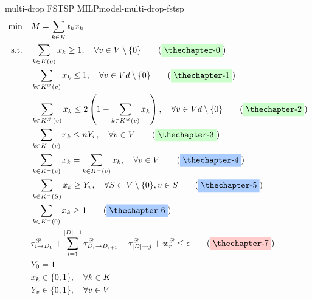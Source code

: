 {
\newcommand{\myYellowTag}[1]{\label{#1}\tag{\colorbox{shallow-yellow}{\theequation}}\addtocounter{equation}{1}}
\newcommand{\myRedTag}[1]{\label{#1}\tag{\colorbox{shallow-red}{\theequation}}\addtocounter{equation}{1}}
\newcommand{\myGreenTag}[1]{\label{#1}\tag{\colorbox{shallow-green}{\theequation}}\addtocounter{equation}{1}}
\newcommand{\myPurpleTag}[1]{\label{#1}\tag{\colorbox{shallow-purple}{\theequation}}\addtocounter{equation}{1}}
\newcommand{\myBlueTag}[1]{\label{#1}\tag{\colorbox{shallow-blue}{\theequation}}\addtocounter{equation}{1}}

\begin{model}{multi-drop FSTSP MILP}{model-multi-drop-fstsp}
\begin{align}
    \min \quad & M = \sum_{k \in K}t_kx_k \label{eq:multi-drop-fstsp-obj}\\
    \text{s.t.} \quad & \sum_{k \in K(v)}x_k \geq 1, \quad \forall v \in V \setminus \{0\}\myGreenTag{eq:multi-drop-fstsp-customer-visit}\\
    \quad & \sum_{k \in K^{\mathscr{D}}(v)}x_k \leq 1, \quad \forall v \in Vd \setminus \{0\}\myGreenTag{eq:multi-drop-fstsp-customer-visit-drone}\\
    \quad & \sum_{k \in K^{\mathscr{T}}(v)}x_k \leq 2\left( 1 - \sum_{k \in K^{\mathscr{D}}(v)}x_k \right), \quad \forall v \in Vd \setminus \{0\}\myGreenTag{eq:multi-drop-fstsp-customer-visit-limit}\\
    \quad & \sum_{k \in K^+(v)}x_k \leq n Y_v, \quad \forall v \in V\myGreenTag{eq:multi-drop-fstsp-start-end-limit}\\
    \quad & \sum_{k \in K^+(v)}x_k = \sum_{k \in K^-(v)}x_k, \quad \forall v \in V\myBlueTag{eq:multi-drop-fstsp-hamiltonian-1}\\
    \quad & \sum_{k \in K^+(S)}x_k \geq Y_v, \quad \forall S \subset V \setminus \{0\}, v \in S\myBlueTag{eq:multi-drop-fstsp-hamiltonian-2}\\
    \quad & \sum_{k \in K^+(0)}x_k \geq 1\myBlueTag{eq:multi-drop-fstsp-hamiltonian-3}\\
    \quad & \tau_{i \to D_1}^{\mathscr{D}} + \sum_{i = 1}^{\lvert D\rvert -1}\tau_{D_i \to D_{i+ 1}}^{\mathscr{D}} + \tau_{\lvert D\rvert \to j}^{\mathscr{D}} + w_r^{\mathscr{D}} \leq \epsilon \myRedTag{eq:multi-drop-fstsp-drone-battery-limit}\\
    \quad & Y_0 = 1\label{eq:multi-drop-fstsp-start}\\
    \quad & x_k \in \{0,1\}, \quad \forall k \in K\label{eq:multi-drop-fstsp-x-limit}\\
    \quad & Y_v \in \{0,1\}, \quad \forall v \in V\label{eq:multi-drop-fstsp-y-limit}
\end{align}
\end{model}
}

